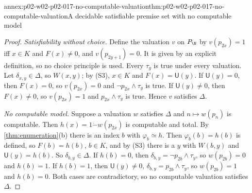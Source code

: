 \begin{annexitem}{annex:p02-w02-p02-017-no-computable-valuation}{thm:p02-w02-p02-017-no-computable-valuation}{A decidable satisfiable premise set with no computable model}
\begin{proof}
\emph{Satisfiability without choice.}  Define the valuation \(v\) on
\(P_{\N}\) by \(v(p_{2x})=1\) iff \(x\in K\) and \(F(x)\ne0\), and
\(v(p_{2y+1})=0\).  It is given by an explicit definition, so no choice
principle is used.  Every \(\tau_y\) is true under every valuation.  Let
\(\delta_{x,y}\in\Delta\), so \(W(x,y)\); by
(S3), \(x\in K\) and
\(F(x)=\mathsf U(y)\).  If \(\mathsf U(y)=0\), then \(F(x)=0\), so
\(v(p_{2x})=0\) and \(\neg p_{2x}\land\tau_y\) is true.  If
\(\mathsf U(y)\ne0\), then \(F(x)\ne0\), so \(v(p_{2x})=1\) and
\(p_{2x}\land\tau_y\) is true.  Hence \(v\) satisfies \(\Delta\).

\emph{No computable model.}  Suppose a valuation \(w\) satisfies
\(\Delta\) and \(n\mapsto w(p_n)\) is computable.  Then
\(h(x)=1\mathbin{\dot{-}} w(p_{2x})\) is computable and total.  By
\cref{thm:enumeration}(b) there is an index \(b\) with
\(\varphi_b\simeq h\).  Then \(\varphi_b(b)=h(b)\) is defined, so
\(F(b)=h(b)\), \(b\in K\), and by (S3)
there is a \(y\) with \(W(b,y)\) and \(\mathsf U(y)=h(b)\).  So
\(\delta_{b,y}\in\Delta\).  If \(h(b)=0\), then \(\delta_{b,y}=\neg
p_{2b}\land\tau_y\), so \(w(p_{2b})=0\) and \(h(b)=1\).  If \(h(b)=1\),
then \(\mathsf U(y)\ne0\), \(\delta_{b,y}=p_{2b}\land\tau_y\), so
\(w(p_{2b})=1\) and \(h(b)=0\).  Both cases are contradictory, so no
computable valuation satisfies \(\Delta\).
\end{proof}
\end{annexitem}

